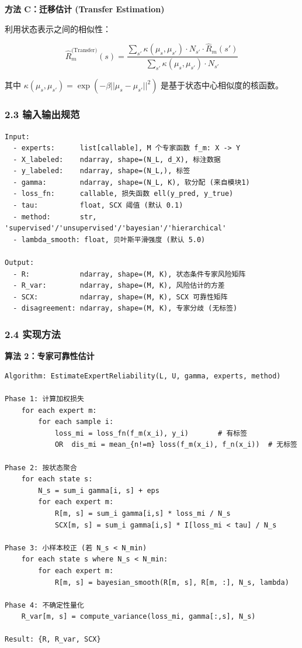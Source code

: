 \documentclass[
  12pt,
]{ctexart}
\begin{document}
\textbf{方法 C：迁移估计 (Transfer Estimation)}

利用状态表示之间的相似性：

\[
\hat{R}_m^{\text{(Transfer)}}(s) = \frac{\sum_{s'} \kappa(\mu_s, \mu_{s'}) \cdot N_{s'} \cdot \hat{R}_m(s')}{\sum_{s'} \kappa(\mu_s, \mu_{s'}) \cdot N_{s'}}
\]

其中 \(\kappa(\mu_s, \mu_{s'}) = \exp(-\beta ||\mu_s - \mu_{s'}||^2)\)
是基于状态中心相似度的核函数。

\subsubsection{2.3
输入输出规范}\label{ux8f93ux5165ux8f93ux51faux89c4ux8303-1}

\begin{verbatim}
Input:
  - experts:      list[callable], M 个专家函数 f_m: X -> Y
  - X_labeled:    ndarray, shape=(N_L, d_X), 标注数据
  - y_labeled:    ndarray, shape=(N_L,), 标签
  - gamma:        ndarray, shape=(N_L, K), 软分配 (来自模块1)
  - loss_fn:      callable, 损失函数 ell(y_pred, y_true)
  - tau:          float, SCX 阈值 (默认 0.1)
  - method:       str, 'supervised'/'unsupervised'/'bayesian'/'hierarchical'
  - lambda_smooth: float, 贝叶斯平滑强度 (默认 5.0)

Output:
  - R:            ndarray, shape=(M, K), 状态条件专家风险矩阵
  - R_var:        ndarray, shape=(M, K), 风险估计的方差
  - SCX:          ndarray, shape=(M, K), SCX 可靠性矩阵
  - disagreement: ndarray, shape=(M, K), 专家分歧 (无标签)
\end{verbatim}

\subsubsection{2.4 实现方法}\label{ux5b9eux73b0ux65b9ux6cd5-1}

\textbf{算法 2：专家可靠性估计}

\begin{verbatim}
Algorithm: EstimateExpertReliability(L, U, gamma, experts, method)

Phase 1: 计算加权损失
    for each expert m:
        for each sample i:
            loss_mi = loss_fn(f_m(x_i), y_i)       # 有标签
            OR  dis_mi = mean_{n!=m} loss(f_m(x_i), f_n(x_i))  # 无标签

Phase 2: 按状态聚合
    for each state s:
        N_s = sum_i gamma[i, s] + eps
        for each expert m:
            R[m, s] = sum_i gamma[i,s] * loss_mi / N_s
            SCX[m, s] = sum_i gamma[i,s] * I[loss_mi < tau] / N_s

Phase 3: 小样本校正 (若 N_s < N_min)
    for each state s where N_s < N_min:
        for each expert m:
            R[m, s] = bayesian_smooth(R[m, s], R[m, :], N_s, lambda)

Phase 4: 不确定性量化
    R_var[m, s] = compute_variance(loss_mi, gamma[:,s], N_s)

Result: {R, R_var, SCX}
\end{verbatim}
\end{document}
